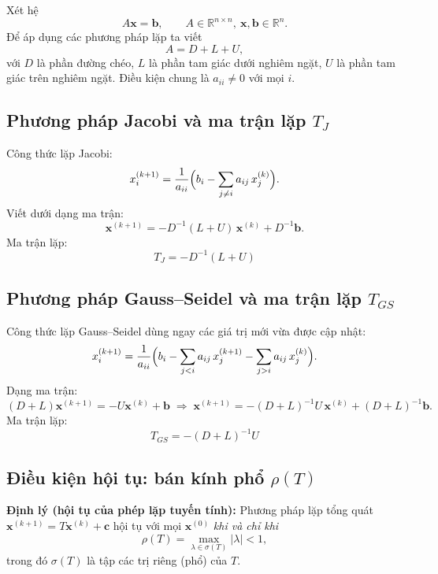 \documentclass[12pt,a4paper]{article}
\begin{document}
Xét hệ
\begin{equation}
    A\mathbf{x} = \mathbf{b}, \qquad A \in \mathbb{R}^{n\times n},\ \mathbf{x},\mathbf{b} \in \mathbb{R}^n.
    \label{eq:sys}
\end{equation}
Để áp dụng các phương pháp lặp ta viết
\[
    A = D + L + U,
\]
với $D$ là phần đường chéo, $L$ là phần tam giác dưới nghiêm ngặt, $U$ là phần tam giác trên nghiêm ngặt. Điều kiện chung là $a_{ii}\ne 0$ với mọi $i$.

\subsection{Phương pháp Jacobi và ma trận lặp $T_J$}

Công thức lặp Jacobi:
\begin{equation}
    x_i^{(k+1)} = \frac{1}{a_{ii}}\Bigl(b_i - \sum_{j\ne i} a_{ij}\,x_j^{(k)}\Bigr).
    \label{eq:jacobi}
\end{equation}
Viết dưới dạng ma trận:
\[
    \mathbf{x}^{(k+1)} = -D^{-1}(L+U)\,\mathbf{x}^{(k)} + D^{-1}\mathbf{b}.
\]
Ma trận lặp:
\begin{equation}
    \boxed{\; T_J = -D^{-1}(L+U) \;}
    \label{eq:TJ}
\end{equation}

\subsection{Phương pháp Gauss--Seidel và ma trận lặp $T_{GS}$}

Công thức lặp Gauss--Seidel dùng ngay các giá trị mới vừa được cập nhật:
\begin{equation}
    x_i^{(k+1)} = \frac{1}{a_{ii}}\Bigl(b_i - \sum_{j<i} a_{ij}\,x_j^{(k+1)} - \sum_{j>i} a_{ij}\,x_j^{(k)}\Bigr).
    \label{eq:gs}
\end{equation}
Dạng ma trận:
\[
    (D + L)\mathbf{x}^{(k+1)} = -U\mathbf{x}^{(k)} + \mathbf{b}
    \;\Longrightarrow\;
    \mathbf{x}^{(k+1)} = -(D+L)^{-1}U\,\mathbf{x}^{(k)} + (D+L)^{-1}\mathbf{b}.
\]
Ma trận lặp:
\begin{equation}
    \boxed{\; T_{GS} = -(D+L)^{-1}U \;}
    \label{eq:TGS}
\end{equation}

\subsection{Điều kiện hội tụ: bán kính phổ $\rho(T)$}

\textbf{Định lý (hội tụ của phép lặp tuyến tính):} Phương pháp lặp tổng quát $\mathbf{x}^{(k+1)} = T\mathbf{x}^{(k)} + \mathbf{c}$ hội tụ với mọi $\mathbf{x}^{(0)}$ \emph{khi và chỉ khi}
\begin{equation}
    \rho(T) = \max_{\lambda\in\sigma(T)} |\lambda| < 1,
    \label{eq:rho}
\end{equation}
trong đó $\sigma(T)$ là tập các trị riêng (phổ) của $T$.
\end{document}
